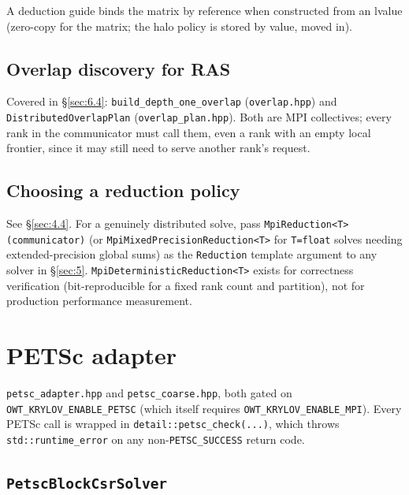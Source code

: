\documentclass[11pt,a4paper]{report}
\newcommand{\secref}[1]{\S\ref{#1}}
\begin{document}
A deduction guide binds the matrix by reference when constructed from
an lvalue (zero-copy for the matrix; the halo policy is stored by
value, moved in).

\section{Overlap discovery for RAS}
\label{sec:8.3}

Covered in \secref{sec:6.4}: \lstinline!build_depth_one_overlap!
(\texttt{overlap.hpp}) and \lstinline!DistributedOverlapPlan!
(\texttt{overlap\_plan.hpp}). Both are MPI collectives; every rank in
the communicator must call them, even a rank with an empty local
frontier, since it may still need to serve another rank's request.

\section{Choosing a reduction policy}
\label{sec:8.4}

See \secref{sec:4.4}. For a genuinely distributed solve, pass
\lstinline!MpiReduction<T>(communicator)! (or \lstinline!MpiMixedPrecisionReduction<T>!
for \lstinline!T=float! solves needing extended-precision global sums) as the
\lstinline!Reduction! template argument to any solver in \secref{sec:5}.
\lstinline!MpiDeterministicReduction<T>! exists for correctness verification
(bit-reproducible for a fixed rank count and partition), not for
production performance measurement.

\chapter{PETSc adapter}
\label{sec:9}

\texttt{petsc\_adapter.hpp} and \texttt{petsc\_coarse.hpp}, both gated
on \lstinline!OWT_KRYLOV_ENABLE_PETSC! (which itself requires
\lstinline!OWT_KRYLOV_ENABLE_MPI!). Every PETSc call is wrapped in
\lstinline!detail::petsc_check(...)!, which throws \lstinline!std::runtime_error! on
any non-\lstinline!PETSC_SUCCESS! return code.

\section{\texorpdfstring{\lstinline!PetscBlockCsrSolver!}{PetscBlockCsrSolver}}
\label{sec:9.1}
\end{document}

